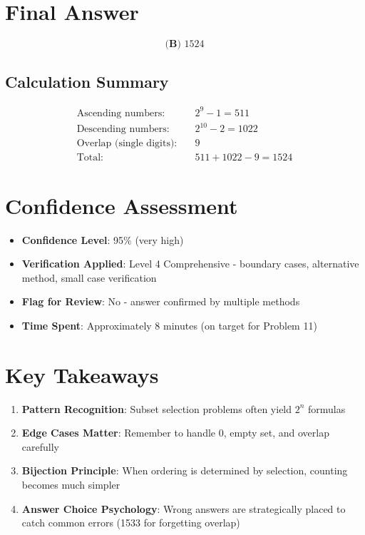 \documentclass[]{article}
\begin{document}
\section*{Final Answer}
\[\boxed{\textbf{(B) } 1524}\]

\subsection*{Calculation Summary}
\begin{align*}
\text{Ascending numbers:} &\quad 2^9 - 1 = 511\\
\text{Descending numbers:} &\quad 2^{10} - 2 = 1022\\
\text{Overlap (single digits):} &\quad 9\\
\text{Total:} &\quad 511 + 1022 - 9 = \boxed{1524}
\end{align*}

\section*{Confidence Assessment}
\begin{itemize}[leftmargin=*]
    \item \textbf{Confidence Level}: 95\% (very high)
    \item \textbf{Verification Applied}: Level 4 Comprehensive - boundary cases, alternative method, small case verification
    \item \textbf{Flag for Review}: No - answer confirmed by multiple methods
    \item \textbf{Time Spent}: Approximately 8 minutes (on target for Problem 11)
\end{itemize}

\section*{Key Takeaways}
\begin{enumerate}
    \item \textbf{Pattern Recognition}: Subset selection problems often yield $2^n$ formulas
    \item \textbf{Edge Cases Matter}: Remember to handle 0, empty set, and overlap carefully
    \item \textbf{Bijection Principle}: When ordering is determined by selection, counting becomes much simpler
    \item \textbf{Answer Choice Psychology}: Wrong answers are strategically placed to catch common errors (1533 for forgetting overlap)
\end{enumerate}
\end{document}
